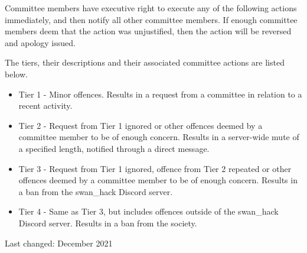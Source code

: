 \documentclass[12pt]{extarticle}
\begin{document}
	Committee members have executive right to execute any of the following actions immediately, and then notify all other committee members. If enough committee members deem that the action was unjustified, then the action will be reversed and apology issued. 
	
	The tiers, their descriptions and their associated committee actions are listed below.
	\begin{itemize}
	    \item Tier 1 - Minor offences. Results in a request from a committee in relation to a recent activity.
	    \item Tier 2 - Request from Tier 1 ignored or other offences deemed by a committee member to be of enough concern. Results in a server-wide mute of a specified length, notified through a direct message.
	    \item Tier 3 - Request from Tier 1 ignored, offence from Tier 2 repeated or other offences deemed by a committee member to be of enough concern. Results in a ban from the swan\_hack Discord server.
	    \item Tier 4 - Same as Tier 3, but includes offences outside of the swan\_hack Discord server. Results in a ban from the society. 
	\end{itemize}
	    
	\footnotesize Last changed: December 2021 
\end{document}
